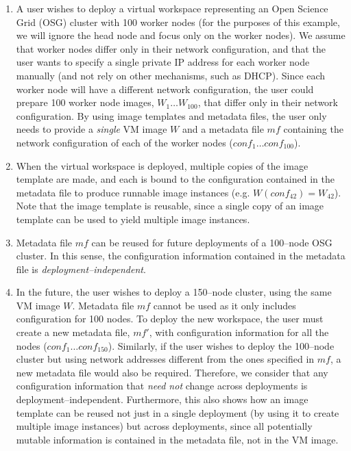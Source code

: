 \begin{enumerate}
\item A user wishes to deploy a virtual workspace representing an Open Science Grid (OSG) cluster with 100 worker nodes (for the purposes of this example, we will ignore the head node and focus only on the worker nodes). We assume that worker nodes differ only in their network configuration, and that the user wants to specify a single private IP address for each worker node manually (and not rely on other mechanisms, such as DHCP). Since each worker node will have a different network configuration, the user could prepare 100 worker node images, $W_1\ldots W_{100}$, that differ only in their network configuration. By using image templates and metadata files, the user only needs to provide a \emph{single} VM image $W$ and a metadata file $mf$ containing the network configuration of each of the worker nodes ($conf_1\ldots conf_{100}$).
\item When the virtual workspace is deployed, multiple copies of the image template are made, and each is bound to the configuration contained in the metadata file to produce runnable image instances (e.g. $W(conf_{42})=W_{42}$). Note that the image template is reusable, since a single copy of an image template can be used to yield multiple image instances.
\item Metadata file $mf$ can be reused for future deployments of a 100--node OSG cluster. In this sense, the configuration information contained in the metadata file is \emph{deployment--independent}.
\item In the future, the user wishes to deploy a 150--node cluster, using the same VM image $W$. Metadata file $mf$ cannot be used as it only includes configuration for 100 nodes. To deploy the new workspace, the user must create a new metadata file, $mf'$, with configuration information for all the nodes ($conf_1\ldots conf_{150}$). Similarly, if the user wishes to deploy the 100--node cluster but using network addresses different from the ones specified in $mf$, a new metadata file would also be required. Therefore, we consider that any configuration information that \emph{need not} change across deployments is deployment--independent. Furthermore, this also shows how an image template can be reused not just in a single deployment (by using it to create multiple image instances) but across deployments, since all potentially mutable information is contained in the metadata file, not in the VM image.
\end{enumerate}

